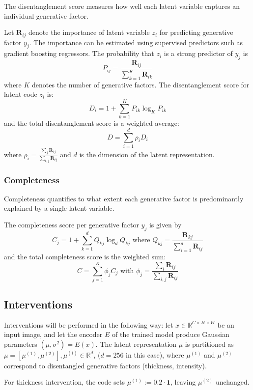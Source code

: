 \documentclass{article}
\begin{document}
	The disentanglement score measures how well each latent variable captures an individual generative factor.
		
	Let $\mathbf{R}_{ij}$ denote the importance of latent variable $z_i$ for predicting generative factor $y_j$. The importance can be estimated using supervised predictors such as gradient boosting regressors. The probability that $z_i$ is a strong predictor of $y_j$ is $$ P_{ij} = \frac{\mathbf{R}_{ij}}{\sum_{k=1}^{K} \mathbf{R}_{ik}} $$ where $K$ denotes the number of generative factors. The disentanglement score for latent code $z_i$ is:
	$$ D_i = 1 + \sum_{k=1}^{K} P_{ik} \log_K P_{ik} $$
	and the total disentanglement score is a weighted average:
	$$ D = \sum_{i=1}^{d} \rho_i D_i $$
	where $\rho_i = \frac{\sum_{j}\mathbf{R}_{ij}}{\sum_{i,j}\mathbf{R}_{ij}}$ and $d$ is the dimension of the latent representation.
	
	\subsubsection*{Completeness}
	
	Completeness quantifies to what extent each generative factor is predominantly explained by a single latent variable.
	
	The completeness score per generative factor $y_j$ is given by $$C_j = 1 + \sum_{k=1}^{d} Q_{kj} \log_d Q_{kj} \text{ where } Q_{kj} = \frac{\mathbf{R}_{kj}}{\sum_{i=1}^{d} \mathbf{R}_{ij}}$$ and the total completeness score is the weighted sum: $$C = \sum_{j=1}^{K} \phi_j C_j \text{ with } \phi_j = \frac{\sum_{i}\mathbf{R}_{ij}}{\sum_{i,j}\mathbf{R}_{ij}}$$
	
	
	\subsection{Interventions}
	
	Interventions will be performed in the following way: let $x \in \mathbb{R}^{C \times H \times W}$ be an input image, and let the encoder $E$ of the trained model produce Gaussian parameters $(\mu, \sigma^2) = E(x)$. The latent representation $\mu$ is partitioned as $\mu = \left[\mu^{(1)}, \mu^{(2)}\right], \mu^{(i)} \in \mathbb{R}^{d}$, ($d = 256$ in this case), where $\mu^{(1)}$ and $\mu^{(2)}$ correspond to disentangled generative factors (thickness, intensity).
	
	For thickness intervention, the code sets $\mu^{(1)} := 0.2 \cdot \mathbf{1}$, leaving $\mu^{(2)}$ unchanged.
	
\end{document}
